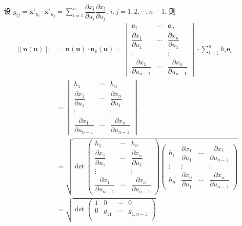 \begin{example}
设 $g_{ij} = \boldsymbol{x}'_{u_i} \cdot \boldsymbol{x}'_{u_j} = \sum_{l=1}^{n} \dfrac{\partial x_l}{\partial u_i}\dfrac{\partial x_l}{\partial u_j}$, $i, j = 1, 2, \cdots, n - 1$. 则
\begin{align*}
  \|\boldsymbol{n}(\boldsymbol{u})\| &= \boldsymbol{n}(\boldsymbol{u}) \cdot \boldsymbol{n}_{0}(\boldsymbol{u}) = \begin{vmatrix}
    \boldsymbol{e}_{1} & \cdots & \boldsymbol{e}_{n} \\
    \dfrac{\partial x_{1}}{\partial u_{1}} & \cdots & \dfrac{\partial x_{n}}{\partial u_{1}} \\
    \vdots & & \vdots \\
    \dfrac{\partial x_{1}}{\partial u_{n-1}} & \cdots & \dfrac{\partial x_{n}}{\partial u_{n-1}}
  \end{vmatrix} \cdot \sum_{i=1}^{n}h_{i}\boldsymbol{e}_{i} \\
  &= \begin{vmatrix}
    h_{1} & \cdots & h_{n} \\
    \dfrac{\partial x_{1}}{\partial u_{1}} & \cdots & \dfrac{\partial x_{n}}{\partial u_{1}} \\
    \vdots & & \vdots \\
    \dfrac{\partial x_{1}}{\partial u_{n-1}} & \cdots & \dfrac{\partial x_{n}}{\partial u_{n-1}}
  \end{vmatrix} \\
  &= \sqrt{\det\begin{pmatrix}
    h_{1} & \cdots & h_{n} \\
    \dfrac{\partial x_{1}}{\partial u_{1}} & \cdots & \dfrac{\partial x_{n}}{\partial u_{1}} \\
    \vdots & & \vdots \\
    \dfrac{\partial x_{1}}{\partial u_{n-1}} & \cdots & \dfrac{\partial x_{n}}{\partial u_{n-1}}
  \end{pmatrix}\begin{pmatrix}
    h_{1} & \dfrac{\partial x_{1}}{\partial u_{1}} & \cdots & \dfrac{\partial x_{1}}{\partial u_{n-1}} \\
    \vdots & \vdots & & \vdots \\
    h_{n} & \dfrac{\partial x_{n}}{\partial u_{1}} & \cdots & \dfrac{\partial x_{n}}{\partial u_{n-1}}
  \end{pmatrix}} \\
  &= \sqrt{\det\begin{pmatrix}
    1 & 0 & \cdots & 0 \\
    0 & g_{11} & \cdots & g_{1,n-1} \\

\end{pmatrix}}
\end{align*}
\end{example}

